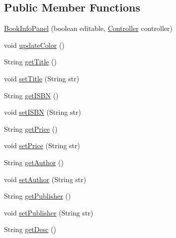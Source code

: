 \subsection*{Public Member Functions}
\begin{DoxyCompactItemize}
\item 
\hyperlink{classw3se_1_1_view_1_1_subpanels_1_1_book_info_panel_a67a13944b37336e683778df8e95583ba}{Book\-Info\-Panel} (boolean editable, \hyperlink{interfacew3se_1_1_controller_1_1_controller}{Controller} controller)
\item 
void \hyperlink{classw3se_1_1_view_1_1_subpanels_1_1_book_info_panel_abb7ce72858aa1cac50e9320a16ec0565}{update\-Color} ()
\item 
String \hyperlink{classw3se_1_1_view_1_1_subpanels_1_1_book_info_panel_af52dba20ab700febf83d5d6a883fcef6}{get\-Title} ()
\item 
void \hyperlink{classw3se_1_1_view_1_1_subpanels_1_1_book_info_panel_ade34c5d59d29ab12ab87ebb48d305be4}{set\-Title} (String str)
\item 
String \hyperlink{classw3se_1_1_view_1_1_subpanels_1_1_book_info_panel_a7905b6eb22709c38ba59cfcf1d57fdfc}{get\-I\-S\-B\-N} ()
\item 
void \hyperlink{classw3se_1_1_view_1_1_subpanels_1_1_book_info_panel_ad757aec2e019d60277370ac04eefa85d}{set\-I\-S\-B\-N} (String str)
\item 
String \hyperlink{classw3se_1_1_view_1_1_subpanels_1_1_book_info_panel_a3143e4a278ee28d4a2083a0622bc670a}{get\-Price} ()
\item 
void \hyperlink{classw3se_1_1_view_1_1_subpanels_1_1_book_info_panel_ab640e3f85c6da42c02e9f242e3766f63}{set\-Price} (String str)
\item 
String \hyperlink{classw3se_1_1_view_1_1_subpanels_1_1_book_info_panel_a9dfde78ddc137d2258705cb619f4baec}{get\-Author} ()
\item 
void \hyperlink{classw3se_1_1_view_1_1_subpanels_1_1_book_info_panel_ae07856de6ee9782dcda2185fed2a6fe3}{set\-Author} (String str)
\item 
String \hyperlink{classw3se_1_1_view_1_1_subpanels_1_1_book_info_panel_a764d69c957bf46435a2773851bb6b305}{get\-Publisher} ()
\item 
void \hyperlink{classw3se_1_1_view_1_1_subpanels_1_1_book_info_panel_a6c838ee7585ef40943ae8e462d88f8e2}{set\-Publisher} (String str)
\item 
String \hyperlink{classw3se_1_1_view_1_1_subpanels_1_1_book_info_panel_a180179e90e77ecc8f1646fbe4ce36124}{get\-Desc} ()

\end{DoxyCompactItemize}
